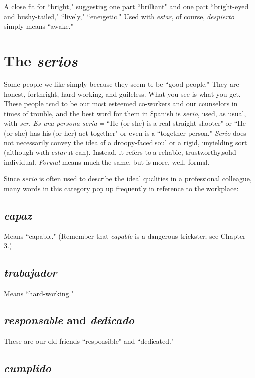 A close fit for ``bright," suggesting one part ``brilliant" and one part ``bright-eyed and bushy-tailed," ``lively," ``energetic." Used with \emph{estar}, of course, \emph{despierto} simply means ``awake."

\section{The \emph{serios}}

Some people we like simply because they seem to be ``good
people." They are honest, forthright, hard-working, and guileless. What
you see is what you get. These people tend to be our most esteemed
co-workers and our counselors in times of trouble, and the best word
for them in Spanish is \emph{serio}, used, as usual, with \emph{ser}. \emph{Es una persona
seria} = ``He (or she) is a real straight-shooter" or ``He (or she) has his
(or her) act together" or even is a ``together person." \emph{Serio} does not
necessarily convey the idea of a droopy-faced soul or a rigid, unyielding
sort (although with \emph{estar} it can). Instead, it refers to a reliable, trustworthy,solid individual. \emph{Formal} means much the same, but is more, well, formal.

Since \emph{serio} is often used to describe the ideal qualities in a
professional colleague, many words in this category pop up frequently
in reference to the workplace:

\subsection{\emph{capaz}}

Means ``capable." (Remember that \emph{capable} is a dangerous trickster; see Chapter 3.)

\subsection{\emph{trabajador}}

Means ``hard-working."

\subsection{\emph{responsable} and \emph{dedicado}}

These are our old friends ``responsible" and ``dedicated."

\subsection{\emph{cumplido}}

